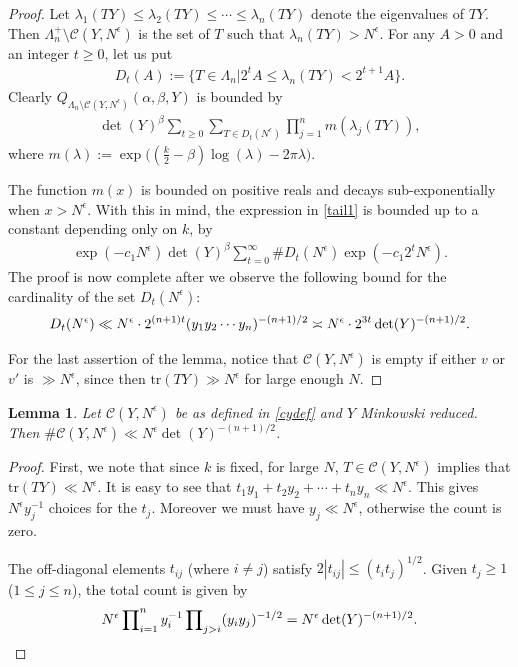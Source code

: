 \documentclass[11pt]{amsart}
\numberwithin{equation}{section}
\theoremstyle{plain}
\newtheorem{lem}[thm]{Lemma}
\theoremstyle{definition}
\newcommand{\mc}{\mathcal}
\newcommand{\tr}{\mathrm{tr}}
\newcommand{\sumn}{\sum \nolimits}
\begin{document}
\begin{proof}
Let $\lambda_1(TY)\le \lambda_2(TY)\le \cdots \le\lambda_n(TY)$ denote the eigenvalues of $TY$. Then $\Lambda_n^+ \setminus \mc C(Y, N^\epsilon)$ is the set of $T$ such that $\lambda_n(TY) > N^\epsilon$. For any $A>0$ and an integer $t\ge 0$, let us put
\begin{align}
    D_t (A):= \{ T \in \Lambda_n    | 2^t A \le \lambda_n(TY) < 2^{t+1}A  \}.
\end{align}
%
Clearly $Q_{\Lambda_n \setminus \mc C(Y, N^\epsilon) }(\alpha, \beta,Y)$ is bounded by
\begin{align} \label{tail1}
\det(Y)^\beta\sumn_{t\ge 0} \sumn_{T \in D_{t}(N^\epsilon)}\prod\nolimits_{j=1}^{n}m(\lambda_j(TY)),
\end{align}
where $ m(\lambda) := \exp \big( (\frac{k}{2}-\beta) \log(\lambda) - 2 \pi \lambda \big)$.

%
The function $m(x)$ is bounded on positive reals and decays sub-exponentially when $x> N^\epsilon$. With this in mind, the expression in \eqref{tail1} is bounded up to a constant depending only on $k$, by
\begin{align}
  \exp(-c_1 N^{\epsilon}) \det(Y)^\beta \sumn_{t=0}^\infty \# D_{t}(N^\epsilon) \exp(-c_1 2^t N^{\epsilon}) .
\end{align}
%
The proof is now complete after we observe the following bound for the cardinality of the set $D_{t}(N^\epsilon)$:
\begin{equation}
    D_{t}(N^\epsilon) \ll N^\epsilon \cdot 2^{(n+1)t} (y_1y_2\cdots y_n)^{-(n+1)/2} \asymp N^\epsilon \cdot 2^{3t} \det(Y)^{-(n+1)/2}. \qedhere
\end{equation}

For the last assertion of the lemma, notice that $\mc C(Y, N^\epsilon)$ is empty if either $v$ or $v'$ is $\gg N^\epsilon$, since then $\tr (TY) \gg N^\epsilon$ for large enough $N$.
\end{proof}

\begin{lem} \label{count-bd2}
  Let $ \mc C(Y, N^\epsilon)$ be as defined in \eqref{cydef} and $Y$ Minkowski reduced.
  Then $\# \mc C(Y, N^\epsilon) \ll N^\epsilon \det(Y)^{-(n+1)/2}$. 
  \end{lem}
\begin{proof}
First, we note that since $k$ is fixed, for large $N$,  $T\in \mc C(Y, N^\epsilon)$ implies that $\tr(TY)\ll N^\epsilon$. It is easy to see that $\displaystyle t_1y_1+t_2y_2+\cdots +t_ny_n \ll N^\epsilon$. This gives $N^\epsilon  y_j^{-1}$ choices for the $t_j$. Moreover we must have $y_j \ll N^\epsilon$, otherwise the count is zero.

The off-diagonal elements $t_{ij}$ (where $i \neq j$) satisfy $2 |t_{ij} |\le (t_i t_j)^{1/2}$. Given $t_j \ge 1$ ($1\le j \le n$), the total count is given by
\begin{equation}
N^\epsilon\prod\nolimits_{i=1}^{n}y_i^{-1}\prod\nolimits_{j>i} (y_iy_j)^{-1/2}= N^{\epsilon}\det(Y)^{-(n+1)/2}. \qedhere
\end{equation}
\end{proof}
\end{document}
